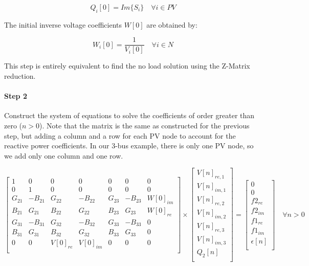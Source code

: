 \documentclass[nols,a4paper,twoside,symmetric,notoc,fleqn]{tufte-book}
\begin{document}
\begin{equation}
{Q}_i[0] = Im \{ {S}_{i} \}  \quad \forall i \in PV
\end{equation}

The initial inverse voltage coefficients ${W}[0]$ are obtained by:

\begin{equation}
W_i[0] = \frac{1}{V_i[0]}  \quad \forall i \in N
\end{equation}

This step is entirely equivalent to find the no load solution using the Z-Matrix reduction.

\paragraph{Step 2}

Construct the system of equations to solve the coefficients of order greater than zero ($n>0$). Note that the matrix is the same as constructed for the previous step, but adding a column and a row for each PV node to account for the reactive power coefficients. In our 3-bus example, there is only one PV node, so we add only one column and one row.

\begin{equation}
\begin{bmatrix}
1 & 0 & 0 & 0 & 0 & 0 & 0\\
0 & 1 & 0 & 0 & 0 & 0 & 0\\
G_{21} & -B_{21} & G_{22} & -B_{22} & G_{23} & -B_{23} & W[0]_{im}\\
B_{21} & G_{21}  & B_{22} & G_{22}  & B_{23} & G_{23} & W[0]_{re}\\
G_{31} & -B_{31} & G_{32} & -B_{32} & G_{33} & -B_{33} & 0\\
B_{31} & G_{31}  & B_{32} & G_{32}  & B_{33} & G_{33} & 0\\
0 & 0 & V[0]_{re} & V[0]_{im} & 0 & 0 & 0\\
\end{bmatrix}
\times
\begin{bmatrix}
V[n]_{re, 1}\\
V[n]_{im, 1}\\
V[n]_{re, 2}\\
V[n]_{im, 2}\\
V[n]_{re, 3}\\
V[n]_{im, 3}\\
Q_2[n]\\
\end{bmatrix}
=
\begin{bmatrix}
0\\
0\\
f2_{re}\\
f2_{im}\\
f1_{re}\\
f1_{im}\\
\epsilon[n]\\
\end{bmatrix}
\quad \forall n > 0
\label{lin_sys_2}
\end{equation}
\end{document}
